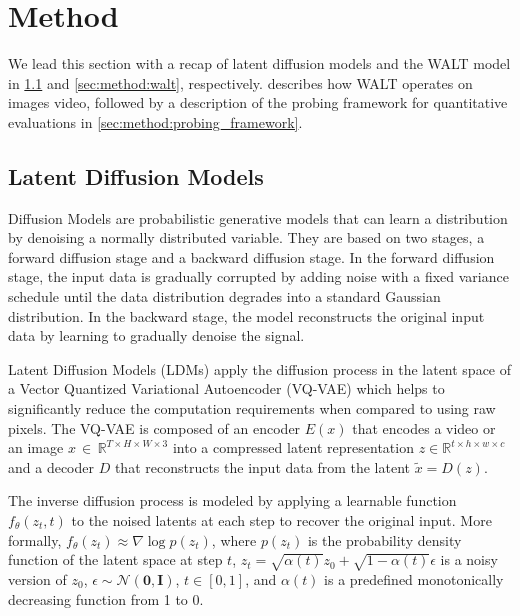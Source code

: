 \section{Method}
\label{sec:method}

We lead this section with a recap of latent diffusion models and the WALT model in \cref{sec:method:latentdiffusionmodels} and \cref{sec:method:walt}, respectively.
 describes how WALT operates on images \vs video, followed by a description of the probing framework for quantitative evaluations in \cref{sec:method:probing_framework}.


\subsection{Latent Diffusion Models}
\label{sec:method:latentdiffusionmodels}

Diffusion Models \cite{sohldickstein2015deepunsupervisedlearningusing} are probabilistic generative models that can learn a distribution by denoising a normally distributed variable. They are based on two stages, a forward diffusion stage and a backward diffusion stage. In the forward diffusion stage, the input data is gradually corrupted by adding noise with a fixed variance schedule until the data distribution degrades into a standard Gaussian distribution.  In the backward stage, the model reconstructs the original input data by learning to gradually denoise the signal. 




Latent Diffusion Models (LDMs) \cite{blattmann2023stable}  apply the diffusion process in the latent space of a Vector Quantized Variational Autoencoder (VQ-VAE) \cite{NeuralDiscreteRepresentationLearning, TamingTransformersForHiResImageSynth} which helps to significantly reduce the computation requirements when compared to using raw pixels. The VQ-VAE is composed of an encoder $E(x)$ that encodes a video or an image ${x}\,{\in}\,\mathbb{R}^{T{\times}H{\times}W{\times}3}$ into a compressed latent representation $ z \in \mathbb{R}^{t\times h \times w \times c} $ and a decoder $D$ that reconstructs the input data from the latent $\widetilde{x}=D(z)$. 

The inverse diffusion process is modeled by applying a learnable function $f_\theta(z_t, t)$ to the noised latents at each step to recover the original input. More formally, $f_\theta(z_t) \approx \nabla \log p(z_t)$, where $p(z_t)$ is the probability density function of the latent space at step $t$,  $z_t = \sqrt{\alpha(t)}z_0 + \sqrt{1-\alpha(t)}\epsilon$ is a noisy version of $z_0$, $\epsilon  \sim  \mathcal{N}(\mathbf{0}, {\mathbf{I}})$, $t \in [0, 1]$, and $\alpha(t)$ is a predefined monotonically decreasing function from 1 to 0.

